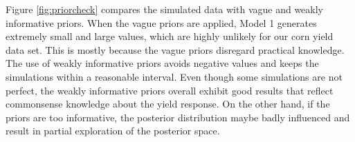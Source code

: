 \documentclass[a4paper]{article}   	%
\begin{document}
	Figure \ref{fig:priorcheck} compares the simulated data with vague and weakly informative priors. When the vague priors are applied, Model 1 generates extremely small and large values, which are highly unlikely for our corn yield data set. This is mostly because the vague priors disregard practical knowledge. The use of weakly informative priors avoids negative values and keeps the simulations within a reasonable interval. Even though some simulations are not perfect, the weakly informative priors overall exhibit good results that reflect commonsense knowledge about the yield response. On the other hand, if the priors are too informative, the posterior distribution maybe badly influenced and result in partial exploration of the posterior space. 
	
	
\end{document}

